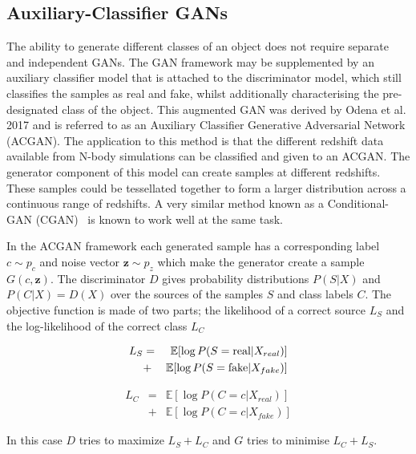 \documentclass[twocolumn]{article}
\newcommand\EE{\mathbb{E}}
\numberwithin{equation}{section}
\begin{document}
\subsection{Auxiliary-Classifier GANs}
The ability to generate different classes of an object does not require separate and independent GANs. The GAN framework 
may be supplemented by an auxiliary classifier model that is attached to the discriminator model, which still classifies 
the samples as real and fake, whilst additionally characterising the pre-designated class of the object. This augmented 
GAN was derived by Odena et al. 2017 \cite{acgan} and is referred to as an Auxiliary Classifier Generative Adversarial 
Network (ACGAN). The application to this method is that the different redshift data available from N-body simulations can 
be classified and given to an ACGAN. The generator component of this model can create samples at different redshifts. 
These samples could be tessellated together to form a larger distribution across a continuous range of  redshifts. A very 
similar method known as a Conditional-GAN (CGAN)~\cite{cgan} is known to work well at the same task.

In the ACGAN framework each generated sample has a corresponding label $c \sim p_c$ and noise vector $\mathbf{z} \sim p_z$ which 
make the generator create a sample $G(c, \mathbf{z})$. The discriminator $D$ gives probability distributions $P(S|X)$ and $P(C|X) 
= D(X)$ over the sources of the samples $S$ and class labels $C$. The objective function is made of two parts; the 
likelihood of a correct source $L_S$ and the log-likelihood of the correct class $L_C$

\begin{eqnarray}
    L_S &=& \EE [\log P(S = \textup{real} | X_{real})] \nonumber \\
        &+& \EE [\log P(S = \textup{fake} | X_{fake})]
\end{eqnarray}

\begin{eqnarray}
    L_C &=& \EE [\log P(C = c | X_{real})] \nonumber \\
        &+& \EE [\log P(C = c | X_{fake})]
\end{eqnarray}

In this case $D$ tries to maximize $L_S + L_C$ and $G$ tries to minimise $L_C + L_S$.



\end{document}

